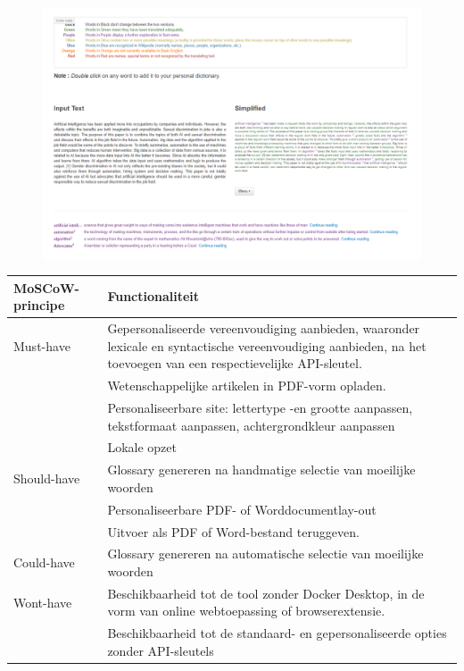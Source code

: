 \begin{figure}[H]
	\includegraphics[width=\linewidth]{img/simplish-output.png}
	\label{img:simplish-output}
\end{figure}

\begin{center}
	\begin{tabular}{ | m{4cm} | m{12cm} | } 
		\hline
		\textbf{MoSCoW-principe} & Functionaliteit \\
		\hline
		Must-have & Gepersonaliseerde vereenvoudiging aanbieden, waaronder lexicale en syntactische vereenvoudiging aanbieden, na het toevoegen van een respectievelijke API-sleutel. \\
		& Wetenschappelijke artikelen in PDF-vorm opladen. \\
		& Personaliseerbare site: lettertype -en grootte aanpassen, tekstformaat aanpassen, achtergrondkleur aanpassen \\
		& Lokale opzet \\
		\hline
		Should-have & Glossary genereren na handmatige selectie van moeilijke woorden \\
		& Personaliseerbare PDF- of Worddocumentlay-out \\
		& Uitvoer als PDF of Word-bestand teruggeven. \\
		\hline
		Could-have & Glossary genereren na automatische selectie van moeilijke woorden \\
		\hline
		Wont-have & Beschikbaarheid tot de tool zonder Docker Desktop, in de vorm van online webtoepassing of browserextensie. \\
		& Beschikbaarheid tot de standaard- en gepersonaliseerde opties zonder API-sleutels \\
		\hline
	\end{tabular}
\end{center}

